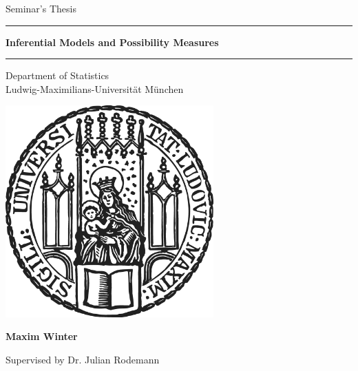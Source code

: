 \begin{titlepage}
\begin{center}
    
\LARGE
Seminar's Thesis
\vspace{0.5cm}

\rule{\textwidth}{1.5pt}
\LARGE
\textbf{Inferential Models and Possibility Measures}
\rule{\textwidth}{1.5pt}
\vspace{0.5cm}

\large
Department of Statistics \\
Ludwig-Maximilians-Universität München \\

\vfill

\includegraphics[width=0.6\textwidth]{Pics/sigillum.png}

\Large
\textbf{Maxim Winter}

\vfill

\normalsize
Supervised by Dr. Julian Rodemann


\end{center}
\end{titlepage}